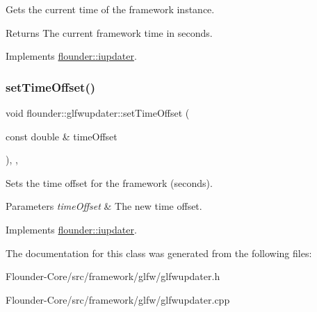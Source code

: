 Gets the current time of the framework instance. 

\begin{DoxyReturn}{Returns}
The current framework time in seconds. 
\end{DoxyReturn}


Implements \hyperlink{classflounder_1_1iupdater_a071086b844e1f90d7f3577e80c9c09fe}{flounder\+::iupdater}.

\mbox{\label{classflounder_1_1glfwupdater_a7dc4371863e39a3a7870e4a2ac539fed}} 
\subsubsection{\texorpdfstring{set\+Time\+Offset()}{setTimeOffset()}}
{\footnotesize\ttfamily void flounder\+::glfwupdater\+::set\+Time\+Offset (\begin{DoxyParamCaption}\item[{const double \&}]{time\+Offset }\end{DoxyParamCaption})\hspace{0.3cm}{\ttfamily [inline]}, {\ttfamily [override]}, {\ttfamily [virtual]}}



Sets the time offset for the framework (seconds). 


\begin{DoxyParams}{Parameters}
{\em time\+Offset} & The new time offset. \\
\hline
\end{DoxyParams}


Implements \hyperlink{classflounder_1_1iupdater_aa6aa143e40a5a39bcd53753798438ea1}{flounder\+::iupdater}.



The documentation for this class was generated from the following files\+:\begin{DoxyCompactItemize}
\item 
Flounder-\/\+Core/src/framework/glfw/glfwupdater.\+h\item 
Flounder-\/\+Core/src/framework/glfw/glfwupdater.\+cpp\end{DoxyCompactItemize}
